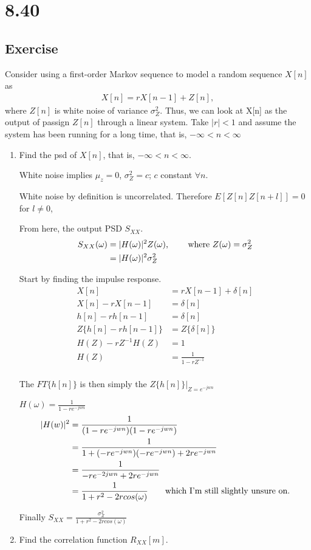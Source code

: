 \documentclass[12pt]{article}
\begin{document}
\section{8.40} 
\subsection{Exercise}
Consider using a first-order Markov sequence to model a random sequence $X[n]$ as 
\begin{align*}
  X[n]=rX[n-1]+Z[n],
\end{align*}
where $Z[n]$ is white noise of variance $\sigma^2_Z$. Thus, we can look at X[n] as the output of passign $Z[n]$ through a linear system. Take $|r|<1$ and assume the system has been running for a long time, that is, $-\infty<n<\infty$




\begin{enumerate}[label=(\alph*)]
 \item Find the psd of $X[n]$, that is, $-\infty<n<\infty$.

White noise implies $\mu_z=0$, $\sigma_Z^2=c$; $c$ constant $\forall n$.

White noise by definition is uncorrelated.  Therefore $E[Z[n]Z[n+l]]=0$ for $l\neq0$, 

From here, the output PSD $S_{XX}$.
\begin{align*}
  S_{XX}(\omega)&=|H(\omega)|^2Z(\omega)\text{, \qquad where $Z(\omega)=\sigma^2_Z$}\\
  &=|H(\omega)|^2\sigma_Z^2
\end{align*}

Start by finding the impulse response.
\begin{align*}
  X[n]&=rX[n-1]+\delta[n]\\
  X[n]-rX[n-1]&=\delta[n]\\
  h[n]-rh[n-1]&=\delta[n]\\
  Z\{h[n]-rh[n-1]\}&=Z\{\delta[n]\}\\
  H(Z)-rZ^{-1}  H(Z)&=1\\
  H(Z)&=\frac{1}{1-rZ^{-1}}\\
\end{align*}

The $FT\{h[n]\}$ is then simply the $Z\{h[n]\}\big|_{Z=e^{-jwn}}$

$H(\omega)=\frac{1}{1-re^{-jwn}}$\\


\begin{align*}
  |H(w)|^2&=\frac{1}{(1-re^{-jwn})(1-re^{-jwn})}\\
  &=\frac{1}{1+(-re^{-jwn})(-re^{-jwn})+2re^{-jwn}}\\
  &=\frac{1}{-re^{-2jwn}+2re^{-jwn}}\\
  &=\frac{1}{1+r^2-2rcos(\omega)}\text{\qquad which I'm still slightly unsure on.}\\
\end{align*}

Finally $S_{XX}=\frac{\sigma^2_Z}{1+r^2-2rcos(\omega)}$


 \item Find the correlation function $R_{XX}[m]$.
\end{enumerate}
\newpage
\end{document}
